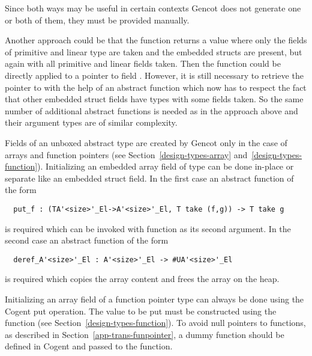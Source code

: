 Since both ways may be useful in certain contexts Gencot does not generate one or both of them, they must be provided manually.

Another approach could be that the function  returns a value where only the fields of primitive and linear type
are taken and the embedded structs are present, but again with all primitive and linear fields taken. Then the function 
could be directly applied to a pointer to field . However, it is still necessary to retrieve the pointer to 
with the help of an abstract function which now has to respect the fact that other embedded struct fields have types with
some fields taken. So the same number of additional abstract functions is needed as in the approach above and their argument
types are of similar complexity.

Fields of an unboxed abstract type are created by Gencot only in the case of arrays and function pointers (see 
Section~\ref{design-types-array} and~\ref{design-types-function}). Initializing an embedded array field  of type 
 can be done in-place or separate like an embedded struct field. In the first case an abstract
function of the form 
\begin{verbatim}
  put_f : (TA'<size>'_El->A'<size>'_El, T take (f,g)) -> T take g
\end{verbatim}
is required which can be invoked with function  as its second argument. In the second case an
abstract function of the form
\begin{verbatim}
  deref_A'<size>'_El : A'<size>'_El -> #UA'<size>'_El
\end{verbatim}
is required which copies the array content and frees the array on the heap.

Initializing an array field  of a function pointer type  can always be done using the Cogent put operation.
The value to be put must be constructed using the function  (see Section~\ref{design-types-function}). To
avoid null pointers to functions, as described in Section~\ref{app-trans-funpointer}, a dummy function should be defined in
Cogent and passed to the  function.

